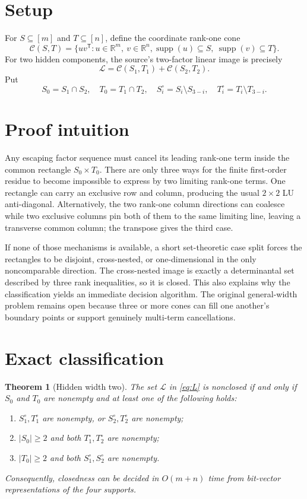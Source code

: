 \documentclass[11pt]{article}
\newtheorem{theorem}{Theorem}
\newcommand{\R}{\mathbb{R}}
\newcommand{\supp}{\operatorname{supp}}
\begin{document}
\section{Setup}

For $S\subseteq[m]$ and $T\subseteq[n]$, define the coordinate rank-one cone
\[
 \mathcal C(S,T)=\{uv^{\mathsf T}:u\in\R^m,\ v\in\R^n,
       \supp(u)\subseteq S,\ \supp(v)\subseteq T\}.
\]
For two hidden components, the source's two-factor linear image is precisely
\[
 \mathcal L=\mathcal C(S_1,T_1)+\mathcal C(S_2,T_2).
 \tag{1}\label{eq:L}
\]
Put
\[
 S_0=S_1\cap S_2,\quad T_0=T_1\cap T_2,\quad
 S_i^\circ=S_i\setminus S_{3-i},\quad
 T_i^\circ=T_i\setminus T_{3-i}.
\]

\section{Proof intuition}

Any escaping factor sequence must cancel its leading rank-one term inside the
common rectangle $S_0\times T_0$. There are only three ways for the finite
first-order residue to become impossible to express by two limiting rank-one
terms. One rectangle can carry an exclusive row and column, producing the
usual $2\times2$ LU anti-diagonal. Alternatively, the two rank-one column
directions can coalesce while two exclusive columns pin both of them to the
same limiting line, leaving a transverse common column; the transpose gives
the third case.

If none of those mechanisms is available, a short set-theoretic case split
forces the rectangles to be disjoint, cross-nested, or one-dimensional in the
only noncomparable direction. The cross-nested image is exactly a determinantal
set described by three rank inequalities, so it is closed. This also explains
why the classification yields an immediate decision algorithm. The original
general-width problem remains open because three or more cones can fill one
another's boundary points or support genuinely multi-term cancellations.

\section{Exact classification}

\begin{theorem}[Hidden width two]\label{thm:classification}
The set $\mathcal L$ in \eqref{eq:L} is nonclosed if and only if $S_0$ and
$T_0$ are nonempty and at least one of the following holds:
\begin{enumerate}[label=\textup{(\roman*)}]
\item $S_1^\circ,T_1^\circ$ are nonempty, or
      $S_2^\circ,T_2^\circ$ are nonempty;
\item $|S_0|\ge2$ and both $T_1^\circ,T_2^\circ$ are nonempty;
\item $|T_0|\ge2$ and both $S_1^\circ,S_2^\circ$ are nonempty.
\end{enumerate}
Consequently, closedness can be decided in $O(m+n)$ time from bit-vector
representations of the four supports.
\end{theorem}
\end{document}

